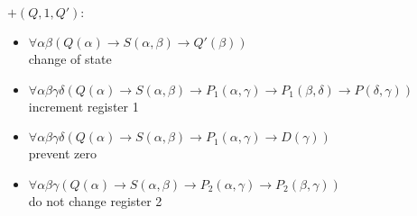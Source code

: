 $+(Q,1,Q'):$
\begin{itemize}
\item $\forall\alpha\beta(Q(\alpha)\to S(\alpha,\beta)\to Q'(\beta))$ \\change of state
\item $\forall\alpha\beta\gamma\delta(Q(\alpha)\to S(\alpha,\beta)\to P_1(\alpha,\gamma)\to P_1(\beta,\delta)\to P(\delta,\gamma))$\\increment register 1
\item $\forall\alpha\beta\gamma\delta(Q(\alpha)\to S(\alpha,\beta)\to P_1(\alpha,\gamma)\to D(\gamma))$ \\prevent zero %
\item $\forall\alpha\beta\gamma(Q(\alpha)\to S(\alpha,\beta)\to P_2(\alpha,\gamma)\to P_2(\beta,\gamma))$ \\do not change register 2
\end{itemize}

